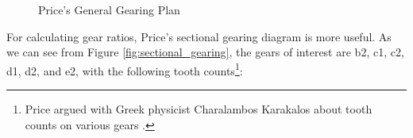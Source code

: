 \documentclass[11pt, oneside]{article}   	%
\theoremstyle{definition}
\begin{document}
\bigskip
\begin{figure}[H]
\caption{Price's General Gearing Plan \cite{gears_from_the_greeks}}
\label{fig:general_gearing_plan}
\end{figure}

\bigskip
\noindent
For calculating gear ratios,  Price's sectional gearing diagram is more useful. As we can see from Figure \ref{fig:sectional_gearing}, the gears of interest
are b2, c1, c2, d1, d2, and e2, with the following tooth counts\footnote{Price argued with Greek physicist Charalambos Karakalos about 
tooth counts on various gears \cite{youtube:freeth2021}.}:
\end{document}
